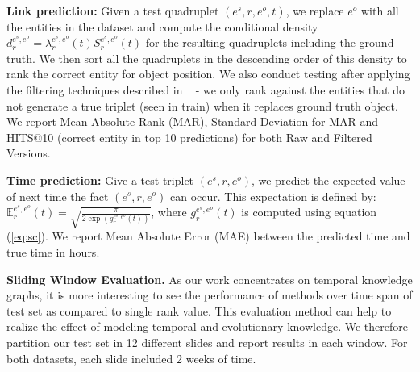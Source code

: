 \documentclass{article}
\begin{document}
{\bf Link prediction:} Given a test quadruplet $(e^s,r,e^o,t)$, we replace $e^o$ with all the entities in the dataset and compute the conditional density $d^{e^s,e^o}_r = \lambda^{e^s,e^o}_r(t)S^{e^s,e^o}_r(t)$ for the resulting quadruplets including the ground truth. We then sort all the quadruplets in the descending order of this density to rank the correct entity for object position. 
We also conduct testing after applying the filtering techniques described in ~\citep{BorUsuGarWesetal13} - we only rank against the entities that do not generate a true triplet (seen in train) when it replaces ground truth object. 
We report Mean Absolute Rank (MAR), Standard Deviation for MAR and HITS@10 (correct entity in top 10 predictions) for both Raw and Filtered Versions. 

{\bf Time prediction:} Give a test triplet $(e^s,r,e^o)$, we predict the expected value of next time the fact $(e^s,r,e^o)$  can occur. This expectation is defined by: $\mathbb{E}^{e^s, e^o}_r(t) = \sqrt{\frac{\pi}{2\exp\left(g^{e^s,e^o}_r(t)\right)}}$, where $g^{e^s,e^o}_r(t)$ is computed using equation (\ref{eq:sc}). We report Mean Absolute Error (MAE) between the predicted time and true time in hours.

{\bf Sliding Window Evaluation.} As our work concentrates on temporal knowledge graphs, it is more interesting to see the performance of methods over time span of test set as compared to single rank value. This evaluation method can help to realize the effect of modeling temporal and evolutionary knowledge. We therefore partition our test set in 12 different slides and report results in each window. For both datasets, each slide included 2 weeks of time. 
\end{document}
